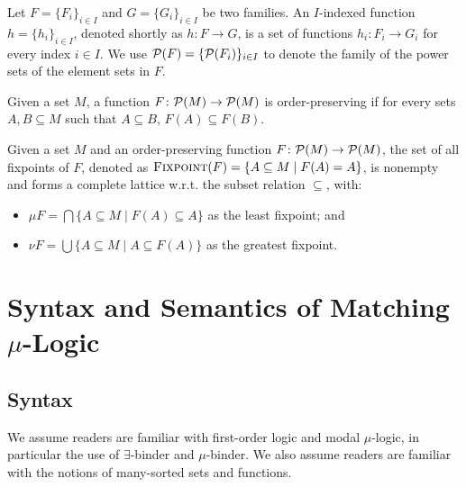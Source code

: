 \documentclass{amsart}
\begin{document}
\begin{notation}
Let $F = \{F_i\}_{i \in I}$ and $G = \{G_i\}_{i \in I}$ be two families. 
An $I$-indexed function $h = \{ h_i \}_{i \in I}$,
denoted shortly as $h \colon F \to G$,
is a set of
functions $h_i \colon F_i \to G_i$ for every index $i \in I$.
We use $\mathcal{P}(F) = \{ \mathcal{P}(F_i) \}_{i \in I}$ to denote the family of 
the power sets of the element sets in $F$.
\end{notation}

\begin{definition}
Given a set $M$, a function $F \colon \mathcal{P}(M) \to \mathcal{P}(M)$ is order-preserving
if
for every sets $A, B \subseteq M$ such that $A \subseteq B$, 
$F(A) \subseteq F(B)$. 
\end{definition}

\begin{theorem}
Given a set $M$ and an order-preserving function $F \colon \mathcal{P}(M) \to
\mathcal{P}(M)$,
the set of all fixpoints of $F$,
denoted as ${\normalfont\textsc{Fixpoint}}(F) = \{ A \subseteq M \mid F(A) = A \}$,
is nonempty and forms a complete lattice w.r.t. the subset relation $\subseteq$,
with:
\begin{itemize}
\item $\mu F = \bigcap \{ A \subseteq M \mid F(A) \subseteq A \}$
as the least fixpoint; and
\item $\nu F = \bigcup \{ A \subseteq M \mid A \subseteq F(A) \}$
as the greatest fixpoint.
\end{itemize}
\end{theorem}

\begin{theorem}
\end{theorem}



\section{Syntax and Semantics of Matching $\mu$-Logic}

\subsection{Syntax}
\label{sec:MmL_sytax}

We assume readers are familiar with first-order logic
and modal $\mu$-logic, in particular the use of
$\exists$-binder and $\mu$-binder. 
We also assume readers are familiar with the notions
of many-sorted sets and functions.
\end{document}
